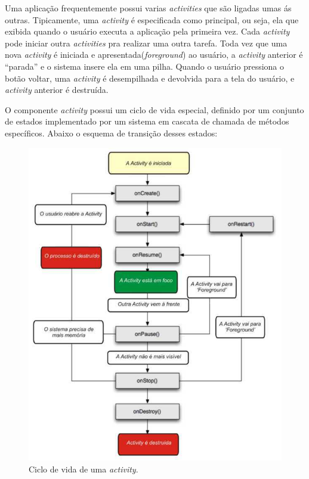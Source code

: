  Uma aplicação frequentemente possui varias \textit{activities} que são ligadas umas ás outras.  
 Tipicamente, uma \textit{activity} é especificada como principal, ou seja, ela que exibida quando o usuário executa 
 a aplicação pela primeira vez. Cada \textit{activity} pode iniciar outra \textit{activities} pra realizar uma outra tarefa. 
 Toda vez que uma nova \textit{activity} é iniciada e apresentada(\textit{foreground}) ao usuário, a \textit{activity} anterior é ``parada'' e o sistema insere ela em uma pilha. 
 Quando o usuário pressiona o botão voltar, uma \textit{activity} é desempilhada e devolvida para a tela do usuário, e \textit{activity} anterior é destruída.
 
 O componente \textit{activity} possui um ciclo de vida especial, definido por um conjunto de estados implementado por 
 um sistema em cascata de chamada de métodos específicos. Abaixo o esquema de transição desses estados:
 \clearpage
 \begin{figure}[hb]
\centering
\includegraphics[scale=0.6]{images/activity-ciclo-de-vida.jpg}
\caption{Ciclo de vida de uma \textit{activity}\cite{android1}. }
\label{fig:activity-lifecycle}
\end{figure}

